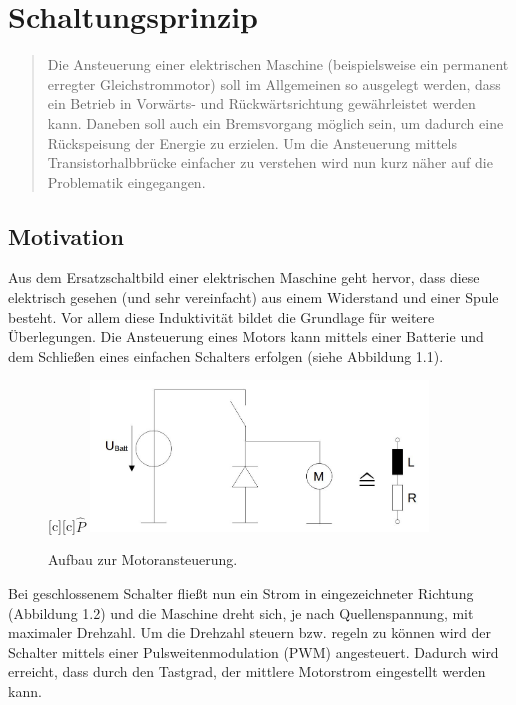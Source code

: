 \chapter{Schaltungsprinzip}
\thispagestyle{mainDocument}
\pagestyle{mainDocument}
\label{chap_2}
\begin{quote}
	Die Ansteuerung einer elektrischen Maschine (beispielsweise ein permanent erregter Gleichstrommotor) soll im Allgemeinen so ausgelegt werden, dass ein Betrieb in Vorwärts- und Rückwärtsrichtung gewährleistet werden kann. Daneben soll auch ein Bremsvorgang möglich sein, um dadurch eine Rückspeisung der Energie zu erzielen. Um die Ansteuerung mittels Transistorhalbbrücke einfacher zu verstehen wird nun kurz näher auf die Problematik eingegangen.
\end{quote}	


\section{Motivation}
\label{sec_2_2}

Aus dem Ersatzschaltbild einer elektrischen Maschine geht hervor, dass diese elektrisch gesehen (und sehr vereinfacht) aus einem Widerstand und einer Spule besteht. Vor allem diese Induktivität bildet die Grundlage für weitere Überlegungen. Die Ansteuerung eines Motors kann mittels einer Batterie und dem Schließen eines einfachen Schalters erfolgen (siehe Abbildung 1.1).
\begin{figure}[H]
	\renewcommand{\figurename}{Abbildung}
	\centering	
	\psfragscanon		
	[c]{$\hat{P}$}
	\includegraphics[width=0.8\textwidth,angle=0]{Bilder/1.jpg}		
	\caption{Aufbau zur Motoransteuerung.}
	\label{ME}
\end{figure}
\newpage
Bei geschlossenem Schalter fließt nun ein Strom in eingezeichneter Richtung (Abbildung 1.2) und die Maschine dreht sich, je nach Quellenspannung, mit maximaler Drehzahl. Um die Drehzahl steuern bzw. regeln zu können wird der Schalter mittels einer Pulsweitenmodulation (PWM) angesteuert. Dadurch wird erreicht, dass durch den Tastgrad, der mittlere Motorstrom eingestellt werden kann. 
 

